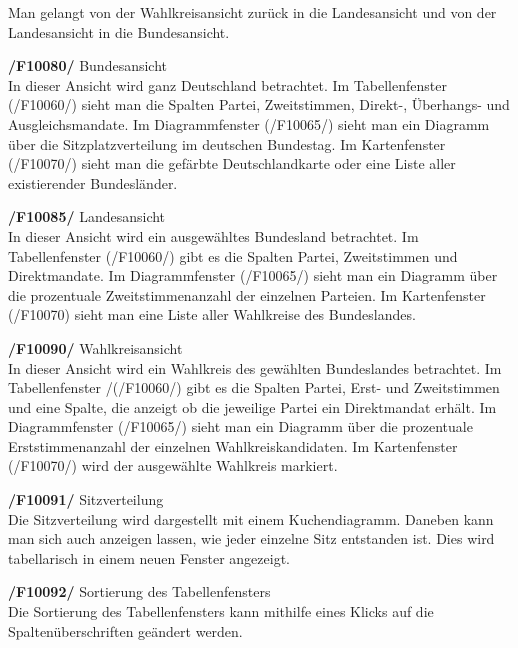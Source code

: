 \documentclass[10pt,a4paper]{article}
\begin{document}
\begin{description}
	Man gelangt von der Wahlkreisansicht zurück in die Landesansicht und von der Landesansicht in die Bundesansicht. \hfill \\
	\item \textbf{/F10080/} Bundesansicht \hfill \\
	In dieser Ansicht wird ganz Deutschland betrachtet. Im Tabellenfenster (/F10060/) sieht man die Spalten Partei, Zweitstimmen, Direkt-, Überhangs- und Ausgleichsmandate. Im Diagrammfenster (/F10065/) sieht man ein Diagramm über die Sitzplatzverteilung im deutschen Bundestag. Im Kartenfenster (/F10070/) sieht man die gefärbte Deutschlandkarte oder eine Liste aller existierender Bundesländer. \hfill \\
	\item \textbf{/F10085/} Landesansicht \hfill \\
	In dieser Ansicht wird ein ausgewähltes Bundesland betrachtet. Im Tabellenfenster (/F10060/) gibt es die Spalten Partei, Zweitstimmen und Direktmandate. Im Diagrammfenster (/F10065/) sieht man ein Diagramm über die prozentuale Zweitstimmenanzahl der einzelnen Parteien. Im Kartenfenster (/F10070) sieht man eine Liste aller Wahlkreise des Bundeslandes. \hfill \\
	\item \textbf{/F10090/} Wahlkreisansicht \hfill \\
	In dieser Ansicht wird ein Wahlkreis des gewählten Bundeslandes betrachtet. Im Tabellenfenster /(/F10060/) gibt es die  Spalten Partei, Erst- und Zweitstimmen und eine Spalte, die anzeigt ob die jeweilige Partei ein Direktmandat erhält. Im Diagrammfenster (/F10065/) sieht man ein Diagramm über die prozentuale Erststimmenanzahl der einzelnen Wahlkreiskandidaten. Im Kartenfenster (/F10070/) wird der ausgewählte Wahlkreis markiert. \hfill \\
	\item \textbf{/F10091/} Sitzverteilung \hfill \\
	Die Sitzverteilung wird dargestellt mit einem Kuchendiagramm. Daneben kann man sich auch anzeigen lassen, wie jeder einzelne Sitz entstanden ist. Dies wird tabellarisch in einem neuen Fenster angezeigt. \hfill \\
	\item \textbf{/F10092/} Sortierung des Tabellenfensters \hfill \\
	Die Sortierung des Tabellenfensters kann mithilfe eines Klicks auf die Spaltenüberschriften geändert werden. \hfill \\
\end{description}
\end{document}
